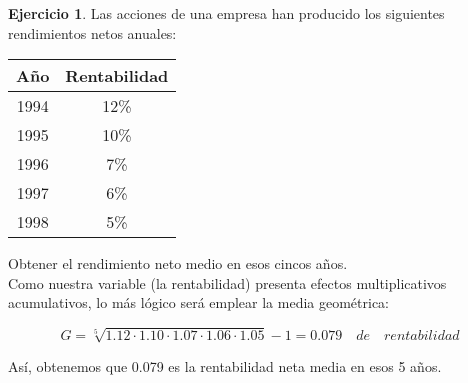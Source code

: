 \documentclass[a4paper, 12pt]{article}
\theoremstyle{definition}
\newtheorem{ej}{Ejercicio}
\begin{document}
\newpage

\begin{ej}
Las acciones de una empresa han producido los siguientes rendimientos netos anuales:

\begin{center}
    \begin{tabular}{c c}
         Año & Rentabilidad  \\
         \hline
         1994 & 12\% \\
         1995 & 10\% \\
         1996 & 7\% \\
         1997 & 6\% \\
         1998 & 5\%
    \end{tabular}
\end{center}

Obtener el rendimiento neto medio en esos cincos años. \\

Como nuestra variable (la rentabilidad) presenta efectos multiplicativos acumulativos, lo más lógico será emplear la media geométrica:

\[
G = \sqrt[5]{1.12 \cdot 1.10 \cdot 1.07 \cdot 1.06 \cdot 1.05} -1= 0.079 \quad de \quad rentabilidad
\]

Así, obtenemos que 0.079 es la rentabilidad neta media en esos 5 años.
\end{ej}
\end{document}
